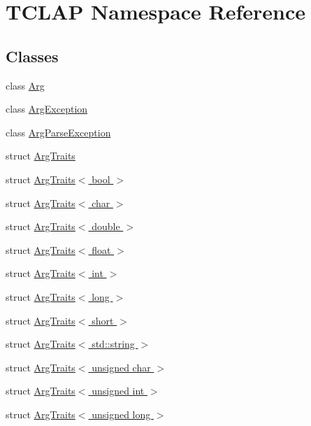 \hypertarget{namespace_t_c_l_a_p}{}\section{T\+C\+L\+A\+P Namespace Reference}
\label{namespace_t_c_l_a_p}
\subsection*{Classes}
\begin{DoxyCompactItemize}
\item 
class \hyperlink{class_t_c_l_a_p_1_1_arg}{Arg}
\item 
class \hyperlink{class_t_c_l_a_p_1_1_arg_exception}{Arg\+Exception}
\item 
class \hyperlink{class_t_c_l_a_p_1_1_arg_parse_exception}{Arg\+Parse\+Exception}
\item 
struct \hyperlink{struct_t_c_l_a_p_1_1_arg_traits}{Arg\+Traits}
\item 
struct \hyperlink{struct_t_c_l_a_p_1_1_arg_traits_3_01bool_01_4}{Arg\+Traits$<$ bool $>$}
\item 
struct \hyperlink{struct_t_c_l_a_p_1_1_arg_traits_3_01char_01_4}{Arg\+Traits$<$ char $>$}
\item 
struct \hyperlink{struct_t_c_l_a_p_1_1_arg_traits_3_01double_01_4}{Arg\+Traits$<$ double $>$}
\item 
struct \hyperlink{struct_t_c_l_a_p_1_1_arg_traits_3_01float_01_4}{Arg\+Traits$<$ float $>$}
\item 
struct \hyperlink{struct_t_c_l_a_p_1_1_arg_traits_3_01int_01_4}{Arg\+Traits$<$ int $>$}
\item 
struct \hyperlink{struct_t_c_l_a_p_1_1_arg_traits_3_01long_01_4}{Arg\+Traits$<$ long $>$}
\item 
struct \hyperlink{struct_t_c_l_a_p_1_1_arg_traits_3_01short_01_4}{Arg\+Traits$<$ short $>$}
\item 
struct \hyperlink{struct_t_c_l_a_p_1_1_arg_traits_3_01std_1_1string_01_4}{Arg\+Traits$<$ std\+::string $>$}
\item 
struct \hyperlink{struct_t_c_l_a_p_1_1_arg_traits_3_01unsigned_01char_01_4}{Arg\+Traits$<$ unsigned char $>$}
\item 
struct \hyperlink{struct_t_c_l_a_p_1_1_arg_traits_3_01unsigned_01int_01_4}{Arg\+Traits$<$ unsigned int $>$}
\item 
struct \hyperlink{struct_t_c_l_a_p_1_1_arg_traits_3_01unsigned_01long_01_4}{Arg\+Traits$<$ unsigned long $>$}
\item 

\end{DoxyCompactItemize}
